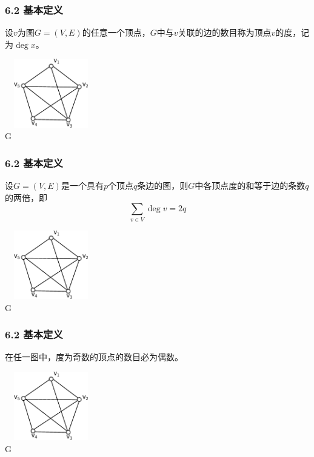 \documentclass{beamer}
\begin{document}
\begin{CJK}{UTF8}{gbsn}
\begin{frame}
  \frametitle{6.2 基本定义}
  \begin{definition6.2.5}
    设$v$为图$G=(V,E)$的任意一个顶点，$G$中与$v$关联的边的数目称为顶点$v$的\alert{度}，记为$\deg x$。
  \end{definition6.2.5}
\centering
\includegraphics[width=4cm,height=3cm]{subgraph1} \\  G   
\end{frame}

\begin{frame}
  \frametitle{6.2 基本定义}
  \begin{theorem6.2.1}
    设$G=(V,E)$是一个具有$p$个顶点$q$条边的图，则$G$中各顶点度的和等于边的条数$q$的两倍，即
        \begin{equation*}
      \sum_{v \in V}\deg v = 2q
    \end{equation*}
  \end{theorem6.2.1}
\centering
\includegraphics[width=4cm,height=3cm]{subgraph1} \\  G   
\end{frame}


\begin{frame}
  \frametitle{6.2 基本定义}
  \begin{theorem6.2.2}
       在任一图中，度为奇数的顶点的数目必为偶数。
  \end{theorem6.2.2}
\centering
\includegraphics[width=4cm,height=3cm]{subgraph1} \\  G 
\end{frame}


\end{CJK}
\end{document}
